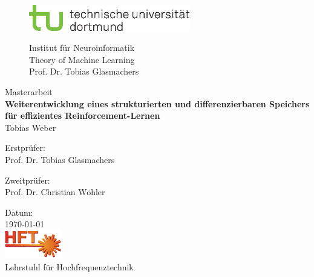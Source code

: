 \begin{titlepage}

\begin{figure}[ht]
\begin{center}
	\begin{minipage}[c]{7.5cm}
		\includegraphics[width=7cm]{abbildungen/tud_logo_cmyk.eps}
	\end{minipage}
	\qquad
		\begin{minipage}[c]{6.5cm}
		\begin{flushright}
		\vspace*{0.50cm}
		\small{
		Institut für Neuroinformatik\\
		Theory of Machine Learning\\
		Prof. Dr. Tobias Glasmachers}
		\end{flushright}
	\end{minipage}
\end{center}
\end{figure}
\vspace*{1.5cm}
\begin{center}
\Large Masterarbeit\\ %
\vspace*{1.0cm}
\huge \textbf{Weiterentwicklung eines strukturierten und differenzierbaren Speichers für effizientes Reinforcement-Lernen}\\		%
\vspace*{1.0cm}
\Large Tobias Weber\\				%
\vspace*{1.5cm}

Erstprüfer:\\
Prof. Dr. Tobias Glasmachers\par\bigskip							%
Zweitprüfer:\\
Prof. Dr. Christian Wöhler


\vspace*{1.5cm}
Datum:\\
 \today	\\
\vspace*{2cm}
\includegraphics[width=2.5cm]{abbildungen/hftLogo.png} \\
\vspace*{0.4cm}
Lehrstuhl für Hochfrequenztechnik\\
\end{center}
\end{titlepage}
